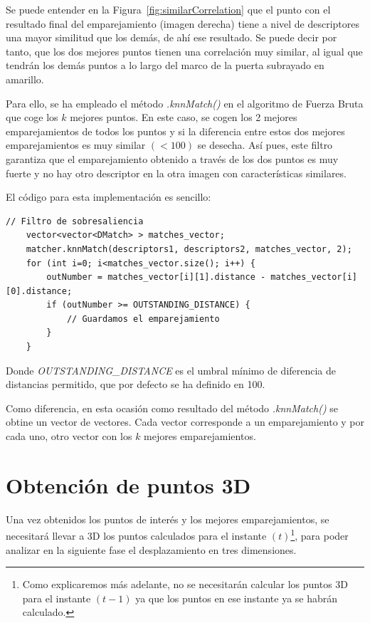 \begin{itemize}
Se puede entender en la Figura~\ref{fig:similarCorrelation} que el punto con el resultado final del emparejamiento (imagen derecha) tiene a nivel de descriptores una mayor similitud que los demás, de ahí ese resultado. Se puede decir por tanto, que los dos mejores puntos tienen una correlación muy similar, al igual que tendrán los demás puntos a lo largo del marco de la puerta subrayado en amarillo.

Para ello, se ha empleado el método \textit{.knnMatch()} en el algoritmo de Fuerza Bruta que coge los $k$ mejores puntos. En este caso, se cogen los 2 mejores emparejamientos de todos los puntos y si la diferencia entre estos dos mejores emparejamientos es muy similar $(< 100)$ se desecha. Así pues, este filtro garantiza que el emparejamiento obtenido a través de los dos puntos es muy fuerte y no hay otro descriptor en la otra imagen con características similares.

El código para esta implementación es sencillo:

\begin{lstlisting}[style=CStyle]
	// Filtro de sobresaliencia
	vector<vector<DMatch> > matches_vector;
	matcher.knnMatch(descriptors1, descriptors2, matches_vector, 2);
	for (int i=0; i<matches_vector.size(); i++) {
		outNumber = matches_vector[i][1].distance - matches_vector[i][0].distance;
		if (outNumber >= OUTSTANDING_DISTANCE) {
			// Guardamos el emparejamiento
		}
	}
\end{lstlisting}

Donde \textit{OUTSTANDING\_DISTANCE} es el umbral mínimo de diferencia de distancias permitido, que por defecto se ha definido en 100.

Como diferencia, en esta ocasión como resultado del método \textit{.knnMatch()} se obtine un vector de vectores. Cada vector corresponde a un emparejamiento y por cada uno, otro vector con los $k$ mejores emparejamientos.

\end{itemize}

\section{Obtención de puntos 3D}

Una vez obtenidos los puntos de interés y los mejores emparejamientos, se necesitará llevar a 3D los puntos calculados para el instante $(t)$\footnote{Como explicaremos más adelante, no se necesitarán calcular los puntos 3D para el instante $(t-1)$ ya que los puntos en ese instante ya se habrán calculado.}, para poder analizar en la siguiente fase el desplazamiento en tres dimensiones.


